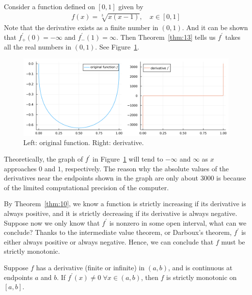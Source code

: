 \documentclass[thmcnt=section, 12pt]{my-elegantbook}
\begin{document}
\begin{example}
    Consider a function defined on $[0, 1]$ given by 
    \begin{align*}
        f(x) = \sqrt[3]{x(x-1)},
        \quad x \in [0, 1]
    \end{align*}
    Note that the derivative exists as a finite number in $(0, 1)$. And it can be shown that $f^\prime_{+}(0) = -\infty$ and $f^\prime_{-}(1) = \infty$. Then Theorem~\ref{thm:13} tells us $f^\prime$ takes all the real numbers in $(0, 1)$. See Figure~\ref{fig:5}.
    \begin{figure}[ht]
        \centering
        \includegraphics[scale=0.2]{figures/graph-006.png}
        \caption{Left: original function. Right: derivative.}
        \label{fig:5}
    \end{figure}

    \begin{note}
        Theoretically, the graph of $f^\prime$ in Figure~\ref{fig:5} will tend to $-\infty$ and $\infty$ as $x$ approaches $0$ and $1$, respectively. The reason why the absolute values of the derivatives near the endpoints shown in the graph are only about $3000$ is because of the limited computational precision of the computer.
    \end{note}
\end{example}


\par By Theorem~\ref{thm:10}, we know a function is strictly increasing if its derivative is always positive, and it is strictly decreasing if its derivative is always negative. Suppose now we only know that $f^\prime$ is nonzero in some open interval, what can we conclude? Thanks to the intermediate value theorem, or Darboux's theorem, $f^\prime$ is either always positive or always negative. Hence, we can conclude that $f$ must be strictly monotonic. 

\begin{theorem}
    Suppose $f$ has a derivative (finite or infinite) in $(a, b)$, and is continuous at endpoints $a$ and $b$. If $f^\prime(x) \neq 0 \; \forall x \in (a, b)$, then $f$ is strictly monotonic on $[a, b]$.
\end{theorem}
\end{document}
